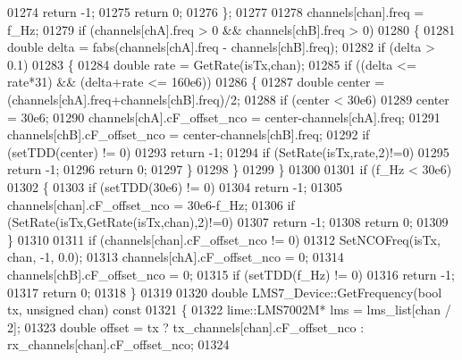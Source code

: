 \begin{DoxyCode}
{{{01274                 \textcolor{keywordflow}{return} -1;
01275         \textcolor{keywordflow}{return} 0;
01276     \};
01277 
01278     channels[chan].freq = f\_Hz;
01279     \textcolor{keywordflow}{if} (channels[chA].freq > 0 && channels[chB].freq > 0)
01280     \{
01281         \textcolor{keywordtype}{double} delta = fabs(channels[chA].freq - channels[chB].freq);
01282         \textcolor{keywordflow}{if} (delta > 0.1)
01283         \{
01284             \textcolor{keywordtype}{double} rate = GetRate(isTx,chan);
01285             \textcolor{keywordflow}{if} ((delta <= rate*31) && (delta+rate <= 160e6))
01286             \{
01287                 \textcolor{keywordtype}{double} center = (channels[chA].freq+channels[chB].freq)/2;
01288                 \textcolor{keywordflow}{if} (center < 30e6)
01289                     center = 30e6;
01290                 channels[chA].cF\_offset\_nco = center-channels[chA].freq;
01291                 channels[chB].cF\_offset\_nco = center-channels[chB].freq;
01292                 \textcolor{keywordflow}{if} (setTDD(center) != 0)
01293                     \textcolor{keywordflow}{return} -1;
01294                 \textcolor{keywordflow}{if} (SetRate(isTx,rate,2)!=0)
01295                     \textcolor{keywordflow}{return} -1;
01296                 \textcolor{keywordflow}{return} 0;
01297             \}
01298         \}
01299     \}
01300 
01301     \textcolor{keywordflow}{if} (f\_Hz < 30e6)
01302     \{
01303         \textcolor{keywordflow}{if} (setTDD(30e6) != 0)
01304             \textcolor{keywordflow}{return} -1;
01305         channels[chan].cF\_offset\_nco = 30e6-f\_Hz;
01306         \textcolor{keywordflow}{if} (SetRate(isTx,GetRate(isTx,chan),2)!=0)
01307             \textcolor{keywordflow}{return} -1;
01308         \textcolor{keywordflow}{return} 0;
01309     \}
01310 
01311     \textcolor{keywordflow}{if} (channels[chan].cF\_offset\_nco != 0)
01312         SetNCOFreq(isTx, chan, -1, 0.0);
01313     channels[chA].cF\_offset\_nco = 0;
01314     channels[chB].cF\_offset\_nco = 0;
01315     \textcolor{keywordflow}{if} (setTDD(f\_Hz) != 0)
01316         \textcolor{keywordflow}{return} -1;
01317     \textcolor{keywordflow}{return} 0;
01318 \}
01319 
01320 \textcolor{keywordtype}{double} LMS7_Device::GetFrequency(\textcolor{keywordtype}{bool} tx, \textcolor{keywordtype}{unsigned} chan)\textcolor{keyword}{ const}
01321 \textcolor{keyword}{}\{
01322    lime::LMS7002M* lms = lms_list[chan / 2];
01323    \textcolor{keywordtype}{double} offset = tx ? tx_channels[chan].cF\_offset\_nco : rx_channels[chan].cF\_offset\_nco;
01324 
}}}
\end{DoxyCode}
